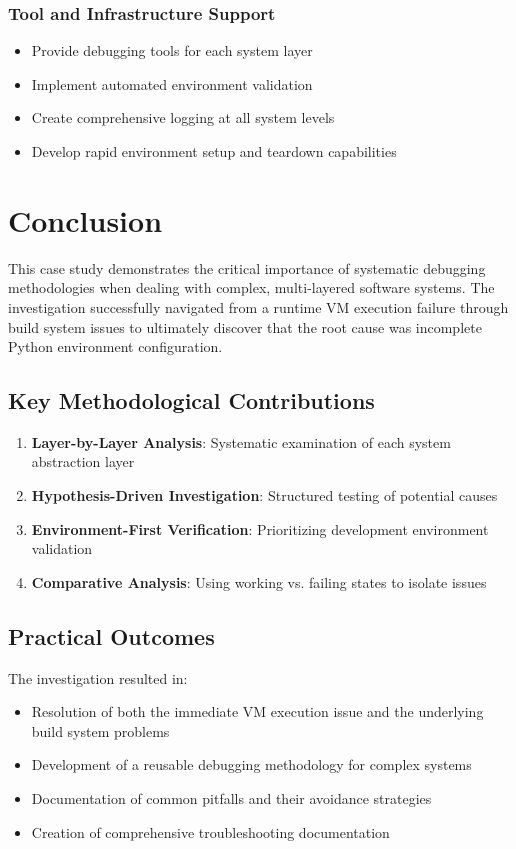 \documentclass[11pt,a4paper]{article}
\begin{document}
\subsubsection{Tool and Infrastructure Support}

\begin{itemize}
\item Provide debugging tools for each system layer
\item Implement automated environment validation
\item Create comprehensive logging at all system levels
\item Develop rapid environment setup and teardown capabilities
\end{itemize}

\section{Conclusion}

This case study demonstrates the critical importance of systematic debugging methodologies when dealing with complex, multi-layered software systems. The investigation successfully navigated from a runtime VM execution failure through build system issues to ultimately discover that the root cause was incomplete Python environment configuration.

\subsection{Key Methodological Contributions}

\begin{enumerate}
\item \textbf{Layer-by-Layer Analysis}: Systematic examination of each system abstraction layer
\item \textbf{Hypothesis-Driven Investigation}: Structured testing of potential causes
\item \textbf{Environment-First Verification}: Prioritizing development environment validation
\item \textbf{Comparative Analysis}: Using working vs. failing states to isolate issues
\end{enumerate}

\subsection{Practical Outcomes}

The investigation resulted in:
\begin{itemize}
\item Resolution of both the immediate VM execution issue and the underlying build system problems
\item Development of a reusable debugging methodology for complex systems
\item Documentation of common pitfalls and their avoidance strategies
\item Creation of comprehensive troubleshooting documentation
\end{itemize}
\end{document}
